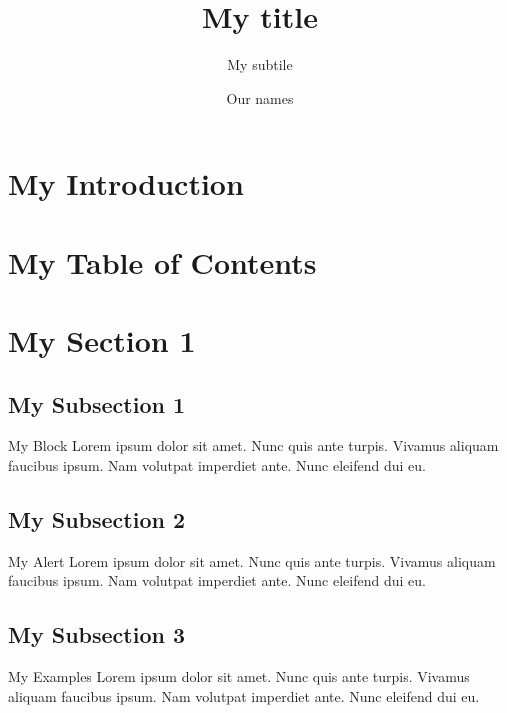 \documentclass[12pt]{beamer}
\author{Our names}
\title{My title}
\subtitle{My subtile}
\begin{document}
\section{My Introduction}
{
  {
  }

  \begin{frame}
    \titlepage
  \end{frame}
}


\section{My Table of Contents}
\begin{frame}
  \tableofcontents
\end{frame}


\section{My Section 1}
\subsection{My Subsection 1}
\begin{frame}
  \begin{block}{My Block}
Lorem ipsum dolor sit amet. Nunc quis ante turpis. Vivamus aliquam faucibus ipsum. Nam volutpat imperdiet ante. Nunc eleifend dui eu.
  \end{block}
\end{frame}

\subsection{My Subsection 2}
\begin{frame}
  \begin{alert}{My Alert}
Lorem ipsum dolor sit amet. Nunc quis ante turpis. Vivamus aliquam faucibus ipsum. Nam volutpat imperdiet ante. Nunc eleifend dui eu.
  \end{alert}
\end{frame}

\subsection{My Subsection 3}
\begin{frame}
  \begin{examples}{My Examples}
Lorem ipsum dolor sit amet. Nunc quis ante turpis. Vivamus aliquam faucibus ipsum. Nam volutpat imperdiet ante. Nunc eleifend dui eu.
  \end{examples}
\end{frame}
\end{document}
